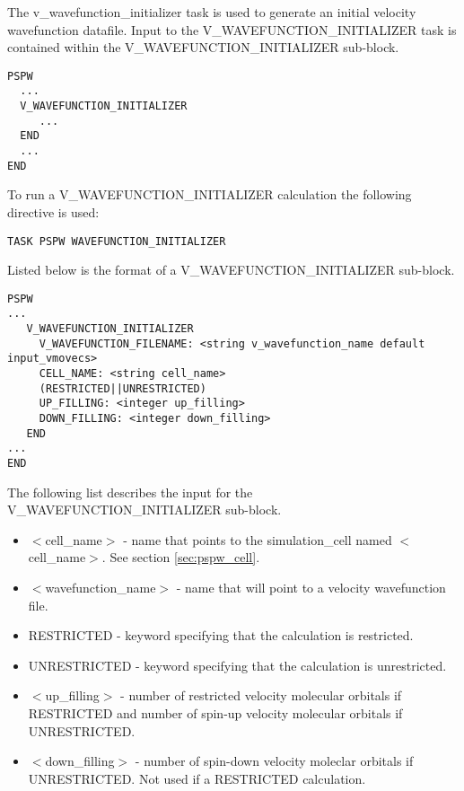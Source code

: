 The v\_wavefunction\_initializer task is used to generate an initial velocity 
wavefunction datafile.
Input to the V\_WAVEFUNCTION\_INITIALIZER task is contained
within the V\_WAVEFUNCTION\_INITIALIZER sub-block.
\begin{verbatim}
PSPW
  ...
  V_WAVEFUNCTION_INITIALIZER
     ...
  END
  ...
END
\end{verbatim}
To run a V\_WAVEFUNCTION\_INITIALIZER calculation the following directive 
is used:
\begin{verbatim}
TASK PSPW WAVEFUNCTION_INITIALIZER
\end{verbatim}
Listed below is the format of a V\_WAVEFUNCTION\_INITIALIZER sub-block.
\begin{verbatim}
PSPW
... 
   V_WAVEFUNCTION_INITIALIZER
     V_WAVEFUNCTION_FILENAME: <string v_wavefunction_name default input_vmovecs>
     CELL_NAME: <string cell_name>
     (RESTRICTED||UNRESTRICTED)
     UP_FILLING: <integer up_filling>
     DOWN_FILLING: <integer down_filling>
   END
...
END
\end{verbatim}
The following list describes the input for the V\_WAVEFUNCTION\_INITIALIZER
sub-block.
\begin{itemize}
        \item $<$cell\_name$>$ - name that points 
                to the simulation\_cell named $<$cell\_name$>$.  See section \ref{sec:pspw_cell}.
        \item $<$wavefunction\_name$>$ - name that will point
              to a velocity wavefunction file.
        \item RESTRICTED - keyword specifying that the calculation is restricted.
        \item UNRESTRICTED - keyword specifying that the calculation is unrestricted.
        \item $<$up\_filling$>$ - number of restricted velocity molecular 
              orbitals if RESTRICTED and number of spin-up velocity molecular 
              orbitals if UNRESTRICTED.
        \item $<$down\_filling$>$ - number of spin-down velocity moleclar 
              orbitals if UNRESTRICTED.  Not used if a RESTRICTED calculation.
\end{itemize}



